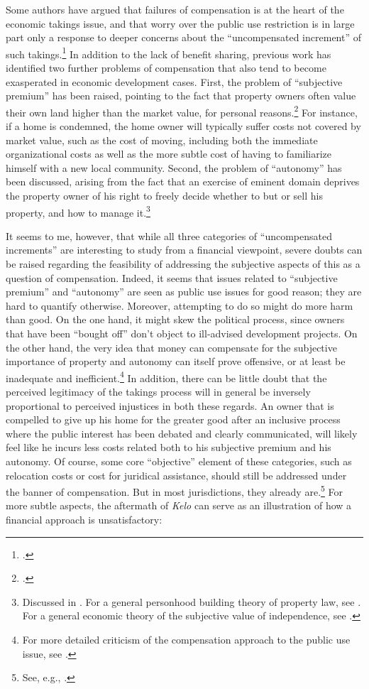 Some authors have argued that failures of compensation is at the heart of the economic takings issue, and that worry over the public use restriction is in large part only a response to deeper concerns about the ``uncompensated increment'' of such takings.\footcite[See][962]{fennell04} In addition to the lack of benefit sharing, previous work has identified two further problems of compensation that also tend to become exasperated in economic development cases. First, the problem of ``subjective premium'' has been raised, pointing to the fact that property owners often value their own land higher than the market value, for personal reasons.\footcite[963]{fennell04} For instance, if a home is condemned, the home owner will typically suffer costs not covered by market value, such as the cost of moving, including both the immediate organizational costs as well as the more subtle cost of having to familiarize himself with a new local community. Second, the problem of ``autonomy'' has been discussed, arising from the fact that an exercise of eminent domain deprives the property owner of his right to freely decide whether to but or sell his property, and how to manage it.\footnote{Discussed in \cite[966-967]{fennell04}. For a general personhood building theory of property law, see \cite{radin93}. For a general economic theory of the subjective value of independence, see \cite{benz08}.}

It seems to me, however, that while all three categories of ``uncompensated increments'' are interesting to study from a financial viewpoint, severe doubts can be raised regarding the feasibility of addressing the subjective aspects of this as a question of compensation. Indeed, it seems that issues related to ``subjective premium'' and ``autonomy'' are seen as public use issues for good reason; they are hard to quantify otherwise. Moreover, attempting to do so might do more harm than good. On the one hand, it might skew the political process, since owners that have been ``bought off'' don't object to ill-advised development projects. On the other hand, the very idea that money can compensate for the subjective importance of property and autonomy can itself prove offensive, or at least be inadequate and inefficient.\footnote{For more detailed criticism of the compensation approach to the public use issue, see \cite{garnett06}.} In addition, there can be little doubt that the perceived legitimacy of the takings process will in general be inversely proportional to perceived injustices in both these regards. An owner that is compelled to give up his home for the greater good after an inclusive process where the public interest has been debated and clearly communicated, will likely feel like he incurs less costs related both to his subjective premium and his autonomy. Of course, some core ``objective'' element of these categories, such as relocation costs or cost for juridical assistance, should still be addressed under the banner of compensation. But in most jurisdictions, they already are.\footnote{See, e.g., \cite[121-126]{garnett06}.} For more subtle aspects, the aftermath of {\it Kelo} can serve as an illustration of how a financial approach is unsatisfactory:

